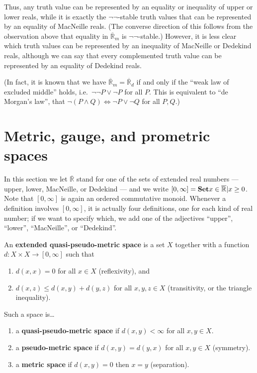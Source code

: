 \documentclass{article}
\def\R{\mathbb{R}}
\def\Re{\overline{\R}}
\def\Rp{[0,\infty]}
\def\Red{\Re_d}
\def\Rem{\Re_m}
\def\nn{\ensuremath{\neg\neg}}
\begin{document}
Thus, any truth value can be represented by an equality or inequality of upper or lower reals, while it is exactly the \nn-stable truth values that can be represented by an equality of MacNeille reals.
(The converse direction of this follows from the observation above that equality in $\Rem$ is \nn-stable.)
However, it is less clear which truth values can be represented by an inequality of MacNeille or Dedekind reals, although we can say that every complemented truth value can be represented by an equality of Dedekind reals.

(In fact, it is known that we have $\Rem = \Red$ if and only if the ``weak law of excluded middle'' holds, i.e.\ $\neg\neg P \lor \neg P$ for all $P$.
This is equivalent to ``de Morgan's law'', that $\neg (P\land Q) \iff \neg P \lor \neg Q$ for all $P,Q$.)


\section{Metric, gauge, and prometric spaces}
\label{sec:metric}

In this section we let $\Re$ stand for one of the sets of extended real numbers --- upper, lower, MacNeille, or Dedekind --- and we write $\Rp = \setof{x\in \Re | x \ge 0 }$.
Note that $\Rp$ is again an ordered commutative monoid.
Whenever a definition involves $\Rp$, it is actually four definitions, one for each kind of real number; if we want to specify which, we add one of the adjectives ``upper'', ``lower'', ``MacNeille'', or ``Dedekind''.

\begin{defn}
  An \textbf{extended quasi-pseudo-metric space} is a set $X$ together with a function $d:X\times X \to \Rp$ such that
  \begin{enumerate}
  \item $d(x,x)=0$ for all $x\in X$ (reflexivity), and
  \item $d(x,z)\le d(x,y)+d(y,z)$ for all $x,y,z\in X$ (transitivity, or the triangle inequality).
  \end{enumerate}
  Such a space is\dots
  \begin{enumerate}[resume]
  \item a \textbf{quasi-pseudo-metric space} if $d(x,y)<\infty$ for all $x,y\in X$.
  \item a \textbf{pseudo-metric space} if $d(x,y)=d(y,x)$ for all $x,y\in X$ (symmetry).
  \item a \textbf{metric space} if $d(x,y)=0$ then $x=y$ (separation).
  \end{enumerate}
\end{defn}
\end{document}
